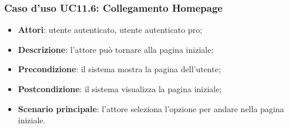 \subsubsection{Caso d'uso UC11.6: Collegamento Homepage}
\begin{itemize}
\item\textbf{Attori}: utente autenticato, utente autenticato pro;
\item\textbf{Descrizione}: l'attore può tornare alla pagina iniziale;
\item\textbf{Precondizione}: il sistema mostra la pagina dell'utente;
\item\textbf{Postcondizione}: il sistema visualizza la pagina iniziale;
\item\textbf{Scenario principale}: l'attore seleziona l'opzione per andare nella pagina iniziale.
\end{itemize}